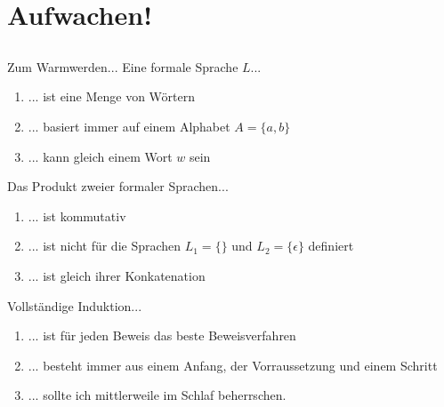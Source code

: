 \section[Einstieg]{Aufwachen!}
\subsection*{}
\begin{frame}{Zum Warmwerden...}
  Eine formale Sprache $L$...
    \begin{enumerate}
    \item { 
    ... ist eine Menge von Wörtern
    }
    \item { 
    ... basiert immer auf einem Alphabet $A=\{a,b \}$
    }
    \item { 
    ... kann gleich einem Wort $w$ sein
    }
    \end{enumerate}

  Das Produkt zweier formaler Sprachen...
    \begin{enumerate}
    \item { 
    ... ist kommutativ
    }
    \item { 
    ... ist nicht für die Sprachen $L_1=\{\}$ und $L_2=\{\epsilon\}$ definiert
    }
    \item { 
    ... ist gleich ihrer Konkatenation
    }
    \end{enumerate}

  Vollständige Induktion...
    \begin{enumerate}
    \item { 
    ... ist für jeden Beweis das beste Beweisverfahren
    }
    \item { 
    ... besteht immer aus einem Anfang, der Vorraussetzung und einem Schritt
    }
    \item { 
    ... sollte ich mittlerweile im Schlaf beherrschen.
    }
    \end{enumerate}
\end{frame}
